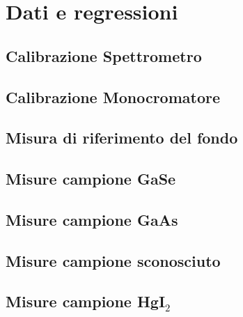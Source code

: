 \documentclass[11pt]{article} %
\begin{document}
\section{Dati e regressioni}
\subsection{Calibrazione Spettrometro}
\subsection{Calibrazione Monocromatore}
\subsection{Misura di riferimento del fondo}
\subsection{Misure campione GaSe}
\subsection{Misure campione GaAs}
\subsection{Misure campione sconosciuto}
\subsection{Misure campione HgI$_2$}
\end{document}
